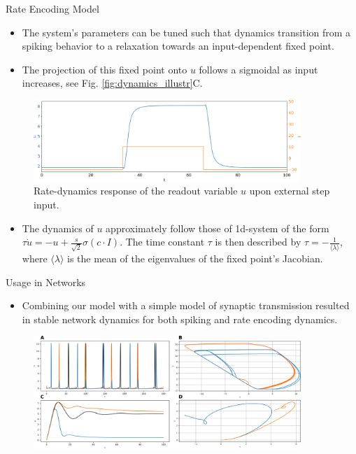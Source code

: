 \documentclass{beamer}
\begin{document}
\begin{frame}[t]
\begin{columns}
\begin{column}{.45\textwidth}
\begin{myblock}{Rate Encoding Model}
\begin{itemize}
\item The system's parameters can be tuned such that dynamics transition from a spiking behavior to a relaxation towards an input-dependent fixed point.
\item The projection of this fixed point onto $u$ follows a sigmoidal as input increases, see Fig. \ref{fig:dynamics_illustr}C.  
\end{itemize}
\begin{figure}
\includegraphics[width=0.9\textwidth]{../figures/graphics/rate_dyn_u_step_illustr.png}
\caption{Rate-dynamics response of the readout variable $u$ upon external step input.}
\label{fig:rate_dyn_u_step}
\end{figure}
\begin{itemize}
\item The dynamics of $u$ approximately follow those of 1d-system of the form $\tau \dot{u} = -u + \frac{s}{\sqrt{2}}\sigma\left( c \cdot I\right)$. The time constant $\tau$ is then described by $\tau = -\frac{1}{\langle \lambda \rangle}$, where $\langle \lambda \rangle$ is the mean of the eigenvalues of the fixed point's Jacobian.
\end{itemize}
\end{myblock}

\begin{myblock}{Usage in Networks}
\begin{itemize}
\item Combining our model with a simple model of synaptic transmission resulted in stable network dynamics for both spiking and rate encoding dynamics.
\end{itemize}
\begin{figure}
\includegraphics[width=0.9\textwidth]{../figures/graphics/network_dyn_combined.png}
\end{figure}
\end{myblock}



\end{column}
\end{columns}
\end{frame}
\end{document}
